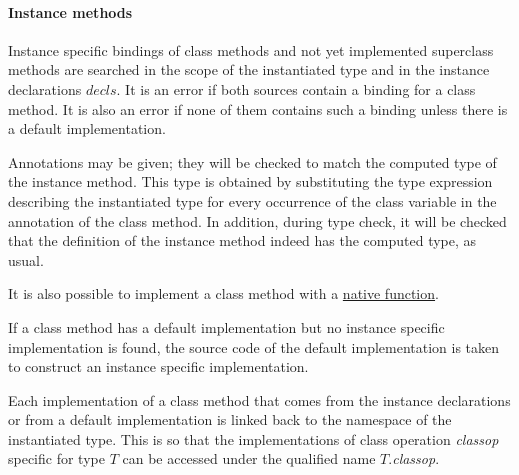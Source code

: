 \paragraph*{Instance methods}
Instance specific bindings of class methods and not yet implemented superclass methods are searched in the scope of the instantiated type and in the instance declarations $decls$.
It is an error if both sources contain a binding for a class method. It is also an error if none of them contains such a binding unless  there is a default implementation.

Annotations may be given; they will be checked to match the computed type of the instance method.
This type is obtained by substituting the type expression describing the instantiated type for every occurrence of the class variable in the annotation of the class method. In addition, during type check, it will be checked that the definition of the instance method indeed has the computed type, as usual.

It is also possible to implement a class method with a \hyperref[nativefun]{native function}.

If a class method has a default implementation but no instance specific implementation is found, the source code of the default implementation is taken to construct an instance specific implementation.

Each implementation of a class method that comes from the instance declarations or from a default implementation is linked back to the namespace of the instantiated type. This is so that the implementations of class operation \emph{classop} specific for type $T$ can be accessed under the qualified name $T$.\emph{classop}.

